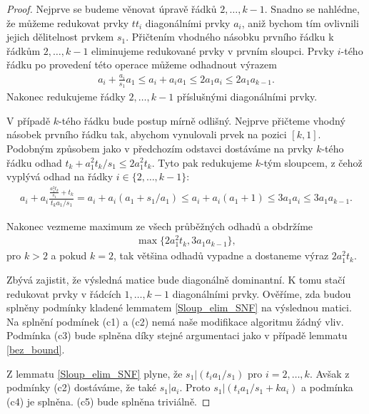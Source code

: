 \begin{proof}
Nejprve se budeme věnovat úpravě řádků $ 2, \dots, k - 1 $. 
Snadno se nahlédne, že můžeme redukovat prvky
$ t t_i $ diagonálními prvky $ a_i $, aniž bychom tím ovlivnili jejich dělitelnost
prvkem $ s_1 $. Přičtením vhodného násobku prvního řádku k řádkům 
$ 2, \dots, k - 1 $ eliminujeme redukované prvky v prvním sloupci. 
Prvky $ i $-tého řádku po provedení této operace můžeme odhadnout
výrazem 
\begin{align*}
    a_i + \frac{a_i}{s_1} a_1
    \leq a_i + a_i a_1
    \leq 2 a_1 a_i
    \leq 2 a_1 a_{k - 1}.
\end{align*}
Nakonec redukujeme řádky $ 2, \dots, k - 1 $ příslušnými diagonálními prvky.

V případě $ k $-tého řádku bude postup mírně odlišný. Nejprve přičteme vhodný 
násobek prvního řádku tak, abychom vynulovali prvek na pozici $ [k, 1] $. 
Podobným způsobem jako v předchozím odstavci dostáváme na prvky $ k $-tého řádku
odhad $ t_k + a_1^2 t_k / s_1 \leq 2 a_1^2 t_k $. Tyto pak redukujeme $ k $-tým 
sloupcem, z čehož vyplývá odhad na řádky $ i \in \{ 2, \dots, k - 1 \} $:
\begin{align*}
    a_i + a_i \frac{\frac{a_1^2 t_k}{s_1} + t_k}{t_k a_1 / s_1} 
        = a_i + a_i (a_1 + s_1 / a_1)
        \leq a_i + a_i (a_1 + 1) 
        \leq 3 a_1 a_i
        \leq 3 a_1 a_{k - 1}.
\end{align*}

Nakonec vezmeme maximum ze všech průběžných odhadů a obdržíme
\begin{align*}
    \max\{ 2 a_1^2 t_k, 3 a_1 a_{k - 1} \},
\end{align*}
pro $ k > 2 $ a pokud $ k = 2 $, tak většina odhadů vypadne a dostaneme výraz
$ 2 a_1^2 t_k $.

Zbývá zajistit, že výsledná matice bude diagonálně dominantní. K tomu stačí 
redukovat prvky v řádcích $ 1, \dots, k - 1 $ diagonálními prvky. Ověříme, zda 
budou splněny podmínky kladené lemmatem \ref{Sloup_elim_SNF} na výslednou matici.
Na splnění podmínek (c1) a (c2) nemá naše modifikace algoritmu žádný vliv.
Podmínka (c3) bude splněna díky stejné argumentaci jako v případě lemmatu
\ref{bez_bound}.

Z lemmatu \ref{Sloup_elim_SNF} plyne, že $ s_1 \vert (t_i a_1/s_1) $ pro
$ i = 2, \dots, k $. Avšak z podmínky (c2) dostáváme, že také $ s_1 \vert a_i $.
Proto $ s_1 \vert (t_i a_1/s_1 + k a_i) $ a podmínka (c4) je splněna. (c5) bude 
splněna triviálně.

\end{proof}

